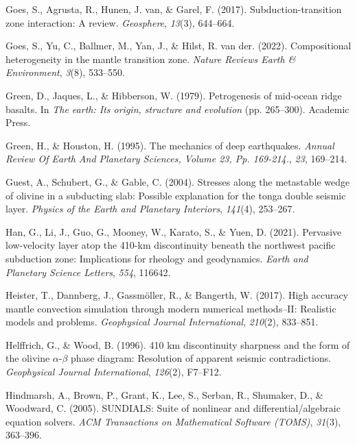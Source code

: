 \documentclass[draft,linenumbers]{agujournal2019}
\newlength{\cslhangindent}
\newenvironment{CSLReferences}[2]
 {\begin{list}{}{
  \setlength{\itemindent}{0pt}
  \setlength{\leftmargin}{0pt}
  \setlength{\parsep}{0pt}
  \ifodd #1
   \setlength{\leftmargin}{\cslhangindent}
   \setlength{\itemindent}{-\cslhangindent}
  \fi
  \setlength{\itemsep}{#2\baselineskip}
  }
  \item\relax}
 {\end{list}}
\begin{document}
\begin{CSLReferences}{1}{0}
Goes, S., Agrusta, R., Hunen, J. van, \& Garel, F. (2017).
Subduction-transition zone interaction: A review. \emph{Geosphere},
\emph{13}(3), 644--664.

Goes, S., Yu, C., Ballmer, M., Yan, J., \& Hilst, R. van der. (2022).
Compositional heterogeneity in the mantle transition zone. \emph{Nature
Reviews Earth \& Environment}, \emph{3}(8), 533--550.

Green, D., Jaques, L., \& Hibberson, W. (1979). Petrogenesis of
mid-ocean ridge basalts. In \emph{The earth: Its origin, structure and
evolution} (pp. 265--300). Academic Press.

Green, H., \& Houston, H. (1995). The mechanics of deep earthquakes.
\emph{Annual Review Of Earth And Planetary Sciences, Volume 23, Pp.
169-214.}, \emph{23}, 169--214.

Guest, A., Schubert, G., \& Gable, C. (2004). Stresses along the
metastable wedge of olivine in a subducting slab: Possible explanation
for the tonga double seismic layer. \emph{Physics of the Earth and
Planetary Interiors}, \emph{141}(4), 253--267.

Han, G., Li, J., Guo, G., Mooney, W., Karato, S., \& Yuen, D. (2021).
Pervasive low-velocity layer atop the 410-km discontinuity beneath the
northwest pacific subduction zone: Implications for rheology and
geodynamics. \emph{Earth and Planetary Science Letters}, \emph{554},
116642.

Heister, T., Dannberg, J., Gassmöller, R., \& Bangerth, W. (2017). High
accuracy mantle convection simulation through modern numerical
methods--II: Realistic models and problems. \emph{Geophysical Journal
International}, \emph{210}(2), 833--851.

Helffrich, G., \& Wood, B. (1996). 410 km discontinuity sharpness and
the form of the olivine \(\alpha\)-\(\beta\) phase diagram: Resolution
of apparent seismic contradictions. \emph{Geophysical Journal
International}, \emph{126}(2), F7--F12.

Hindmarsh, A., Brown, P., Grant, K., Lee, S., Serban, R., Shumaker, D.,
\& Woodward, C. (2005). SUNDIALS: Suite of nonlinear and
differential/algebraic equation solvers. \emph{ACM Transactions on
Mathematical Software (TOMS)}, \emph{31}(3), 363--396.


\end{CSLReferences}
\end{document}

